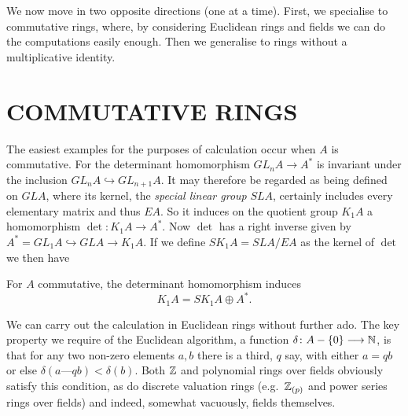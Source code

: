 We now move in two opposite directions (one at a time). First, we specialise to commutative rings, where, by considering Euclidean rings and fields we can do the computations easily enough. Then we generalise to rings without a multiplicative identity.

\section*{COMMUTATIVE RINGS}
The easiest examples for the purposes of calculation occur when $A$ is commutative. For the determinant homomorphism $GL_nA\longrightarrow A^*$ is invariant under the inclusion $GL_nA\hookrightarrow GL_{n+1}A$. It may therefore be regarded as being defined on $GLA$, where its kernel, the {\em special linear group} $SLA$, certainly includes every elementary matrix and thus $EA$. So it induces on the quotient group $K_1A$ a homomorphism $\det\colon  K_1A\longrightarrow A^*$. Now $\det$ has a right inverse given by $A^*=GL_1A\hookrightarrow GLA\longrightarrow K_1A$. If we define $SK_1A=SLA/EA$ as the kernel of $\det$ we then have
\begin{prop}
For $A$ commutative, the determinant homomorphism induces
\[K_1A=SK_1A\oplus A^*.\]
\end{prop}

We can carry out the calculation in Euclidean rings without further ado. The key property we require of the Euclidean algorithm, a function $\delta\colon  A-\{0\}\longrightarrow \mathbb{N}$, is that for any two non-zero elements $a,b$ there is a third, $q$ say, with either $a=qb$ or else $\delta(a—qb)<\delta(b)$. Both $\mathbb{Z}$ and polynomial rings over fields obviously satisfy this condition, as do discrete valuation rings (e.g.\  $\mathbb{Z}_{(p)}$ and power series rings over fields) and indeed, somewhat vacuously, fields themselves.

